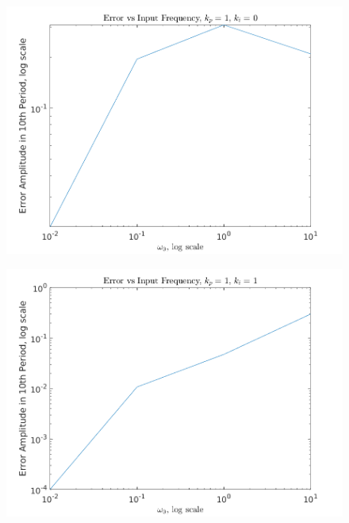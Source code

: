 \documentclass[11pt]{article}
\theoremstyle{definition}
\begin{document}
\begin{enumerate}
\begin{enumerate}
        \begin{figure}
            \centering
            \includegraphics{ES155P1_4ci_error.png}
            \caption{}
            \label{fig.error_i}
        \end{figure}
        
        \begin{figure}
            \centering
            \includegraphics{ES155P1_4cii_error.png}
            \caption{}
            \label{fig.error_ii}
        \end{figure}


\end{enumerate}
\end{enumerate}
\end{document}
